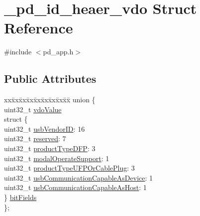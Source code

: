 \hypertarget{struct__pd__id__heaer__vdo}{\section{\-\_\-pd\-\_\-id\-\_\-heaer\-\_\-vdo Struct Reference}
\label{struct__pd__id__heaer__vdo}
}


{\ttfamily \#include $<$pd\-\_\-app.\-h$>$}

\subsection*{Public Attributes}
\begin{DoxyCompactItemize}
\item 
\begin{tabbing}
xx\=xx\=xx\=xx\=xx\=xx\=xx\=xx\=xx\=\kill
union \{\\
\>uint32\_t \hyperlink{struct__pd__id__heaer__vdo_ab1f86734d25b3b0135b97b567dbbf827}{vdoValue}\\
\>struct \{\\
\>\>uint32\_t \hyperlink{struct__pd__id__heaer__vdo_ac60e1351de454f4102ab80718eed2c67}{usbVendorID}: 16\\
\>\>uint32\_t \hyperlink{struct__pd__id__heaer__vdo_a43740bc954203ec44d1ca7bd2855b6c3}{reserved}: 7\\
\>\>uint32\_t \hyperlink{struct__pd__id__heaer__vdo_aef462ffc653ad2c2633fd6bff1eadb0a}{productTypeDFP}: 3\\
\>\>uint32\_t \hyperlink{struct__pd__id__heaer__vdo_a05bbc0945df5f73e31fd61813c47333d}{modalOperateSupport}: 1\\
\>\>uint32\_t \hyperlink{struct__pd__id__heaer__vdo_a20e16d999c9ca067508530a798a97700}{productTypeUFPOrCablePlug}: 3\\
\>\>uint32\_t \hyperlink{struct__pd__id__heaer__vdo_ad331325dfcf70a48ea3511868148af2f}{usbCommunicationCapableAsDevice}: 1\\
\>\>uint32\_t \hyperlink{struct__pd__id__heaer__vdo_a205f468c3e9ddb3895ffcf9b94ab3659}{usbCommunicationCapableAsHost}: 1\\
\>\} \hyperlink{struct__pd__id__heaer__vdo_aa8e2886698b5a02a2245c9a3fb667783}{bitFields}\\
\}; \\


\end{tabbing}
\end{DoxyCompactItemize}

